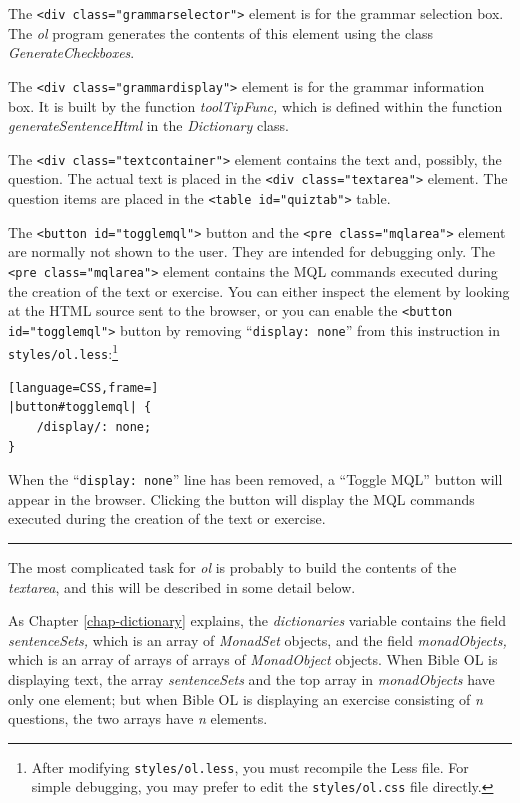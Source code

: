 \documentclass[11pt,oneside,a4paper]{memoir}
\newcommand*{\xml}[1]{\texttt{<#1>}}
\begin{document}
The \xml{div class="grammarselector"} element is for the grammar selection box. The \emph{ol} program
generates the contents of this element using the class \emph{GenerateCheckboxes}.

The \xml{div class="grammardisplay"} element is for the grammar information box. It is built by the
function \emph{toolTipFunc,} which is defined within the function \emph{generateSentenceHtml} in the
\emph{Dictionary} class.

The \xml{div class="textcontainer"} element contains the text and, possibly, the question. The
actual text is placed in the \xml{div class="textarea"} element. The question items are placed
in the \xml{table id="quiztab"} table.

The \xml{button id="togglemql"} button and the \xml{pre class="mqlarea"} element are
normally not shown to the user. They are intended for debugging only. The \xml{pre class="mqlarea"} element contains
the MQL commands executed during the creation of the text or exercise. You can either inspect the
element by looking at the HTML source sent to the browser, or you can enable the \xml{button id="togglemql"} button
by removing ``\texttt{display:~none}'' from this instruction in
\texttt{styles/ol.less}:\footnote{After modifying \texttt{styles/ol.less}, you must recompile the
  Less file. For simple debugging, you may prefer to edit the \texttt{styles/ol.css} file directly.}

\begin{lstlisting}[language=CSS,frame=]
|button#togglemql| {
    /display/: none;
}
\end{lstlisting}

When the ``\texttt{display:~none}'' line has been removed, a ``Toggle MQL'' button will appear in
the browser. Clicking the button will display the MQL commands executed during the creation of the
text or exercise.

\pfbreak

The most complicated task for \emph{ol} is probably to build the contents of the \emph{textarea},
and this will be described in some detail below.

As Chapter \ref{chap-dictionary} explains, the \emph{dictionaries} variable contains the field
\emph{sentenceSets,} which is an array of \emph{MonadSet} objects, and the field
\emph{monadObjects,} which is an array of arrays of arrays of \emph{MonadObject} objects. When Bible
OL is displaying text, the array \emph{sentenceSets} and the top array in \emph{monadObjects} have
only one element; but when Bible OL is displaying an exercise consisting of \emph{n} questions, the
two arrays have \emph{n} elements.
\end{document}
